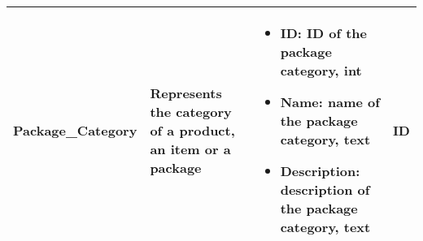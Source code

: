 \begin{longtable}{|p{}|p{} |p{}|p{} |}
    Package\_Category & Represents the category of a product, an item or a package &
        \begin{itemize}
            \vspace{-1em}
            \item ID:   ID of the package category, int
            \item Name:   name of the package category, text
            \item Description:   description of the package category, text
        \end{itemize}
    &  ID \\\hline

\end{longtable}